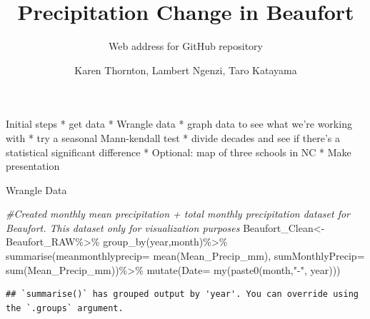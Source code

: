 \documentclass[
  12pt,
]{article}
\title{Precipitation Change in Beaufort}
\subtitle{Web address for GitHub repository}
\author{Karen Thornton, Lambert Ngenzi, Taro Katayama}
\date{}
\newenvironment{Shaded}{\begin{snugshade}}{\end{snugshade}}
\newcommand{\AttributeTok}[1]{\textcolor[rgb]{0.77,0.63,0.00}{#1}}
\newcommand{\CommentTok}[1]{\textcolor[rgb]{0.56,0.35,0.01}{\textit{#1}}}
\newcommand{\FunctionTok}[1]{\textcolor[rgb]{0.00,0.00,0.00}{#1}}
\newcommand{\NormalTok}[1]{#1}
\newcommand{\OtherTok}[1]{\textcolor[rgb]{0.56,0.35,0.01}{#1}}
\newcommand{\SpecialCharTok}[1]{\textcolor[rgb]{0.00,0.00,0.00}{#1}}
\newcommand{\StringTok}[1]{\textcolor[rgb]{0.31,0.60,0.02}{#1}}
\begin{document}
\maketitle

\newpage
\tableofcontents 
\newpage
\listoftables 
\newpage
\listoffigures 
\newpage

Initial steps * get data * Wrangle data * graph data to see what we're
working with * try a seasonal Mann-kendall test * divide decades and see
if there's a statistical significant difference * Optional: map of three
schools in NC * Make presentation

Wrangle Data

\begin{Shaded}
\begin{Highlighting}[]
\CommentTok{\#Created monthly mean precipitation + total monthly precipitation dataset for Beaufort. This dataset only for visualization purposes}
\NormalTok{Beaufort\_Clean}\OtherTok{\textless{}{-}}\NormalTok{ Beaufort\_RAW}\SpecialCharTok{\%\textgreater{}\%}
  \FunctionTok{group\_by}\NormalTok{(year,month)}\SpecialCharTok{\%\textgreater{}\%}
   \FunctionTok{summarise}\NormalTok{(}\AttributeTok{meanmonthlyprecip=} \FunctionTok{mean}\NormalTok{(Mean\_Precip\_mm),}
             \AttributeTok{sumMonthlyPrecip=} \FunctionTok{sum}\NormalTok{(Mean\_Precip\_mm))}\SpecialCharTok{\%\textgreater{}\%}
  \FunctionTok{mutate}\NormalTok{(}\AttributeTok{Date=} \FunctionTok{my}\NormalTok{(}\FunctionTok{paste0}\NormalTok{(month,}\StringTok{"{-}"}\NormalTok{, year)))}
\end{Highlighting}
\end{Shaded}

\begin{verbatim}
## `summarise()` has grouped output by 'year'. You can override using the `.groups` argument.
\end{verbatim}
\end{document}
